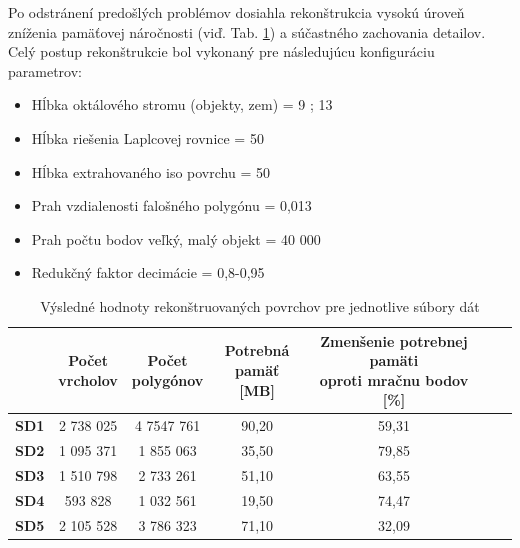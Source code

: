 \indent Po odstránení predošlých problémov dosiahla rekonštrukcia vysokú úroveň zníženia pamäťovej náročnosti (viď. Tab. \ref{table:mesh_results}) a súčastného zachovania detailov. Celý postup rekonštrukcie bol vykonaný pre následujúcu konfiguráciu parametrov:

\begin{itemize}
  \setlength\itemsep{0.2em}
  \item Hĺbka oktálového stromu (objekty, zem) = 9 ; 13
  \item Hĺbka riešenia Laplcovej rovnice = 50
  \item Hĺbka extrahovaného iso povrchu = 50
  \item Prah vzdialenosti falošného polygónu = 0,013
  \item Prah počtu bodov veľký, malý objekt = 40 000
  \item Redukčný faktor decimácie = 0,8-0,95
\end{itemize}

\begin{table} [!h]
  \begin{center} %
      \begin{tabular}{|c || c | c | c | c | c| c|} 
       \hline
        & \thead{Počet \\ vrcholov} &
          \thead{Počet \\ polygónov} &
          \thead{Potrebná \\ pamäť [MB]} &
          \thead{Zmenšenie potrebnej pamäti \\ oproti mračnu bodov [\%]} \\ [0.5ex]    
       \hline\hline
       \textbf{SD1} & 2 738 025  & 4 7547 761 & 90,20 & 59,31 \\ 
       \hline
       \textbf{SD2} & 1 095 371  & 1 855 063 & 35,50 & 79,85 \\
       \hline
       \textbf{SD3} &  1 510 798  & 2 733 261 & 51,10 & 63,55 \\
       \hline
       \textbf{SD4} & 593 828  & 1 032 561 & 19,50 & 74,47 \\
       \hline
       \textbf{SD5} & 2 105 528  & 3 786 323 & 71,10 & 32,09 \\ 
       \hline
      \end{tabular}
  \caption{Výsledné hodnoty rekonštruovaných povrchov pre jednotlive súbory dát}
  \label{table:mesh_results}
  \end{center}
\end{table}

